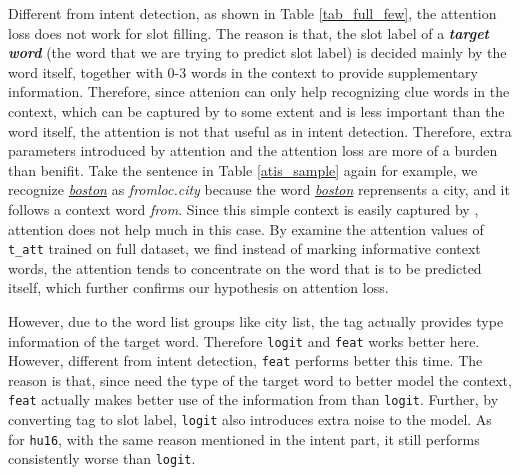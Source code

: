 Different from intent detection, as shown in Table \ref{tab_full_few}, the attention loss does not work for slot filling.
The reason is that, the slot label of a \textbf{\emph{target word}} (the word that we are trying to predict slot label) is decided mainly by the word itself, together with 0-3 words in the context to provide supplementary information.
Therefore, since attenion can only help recognizing clue words in the context, which can be captured by \BLSTM to some extent and is less important than the word itself, the attention is not that useful as in intent detection.
Therefore, extra parameters introduced by attention and the attention loss are more of a burden than benifit.
Take the sentence in Table \ref{atis_sample} again for example, we recognize \textsl{\underline{boston}} as \emph{fromloc.city} because the
word \textsl{\underline{boston}} reprensents a city, and it follows a context word \emph{from}. Since this simple context is easily
captured by \BLSTM, attention does not help much in this case. By examine the attention values of \texttt{t\_att} trained on full dataset,
we find instead of marking informative context words, the attention tends to concentrate on the word that is to be predicted itself, which
further confirms our hypothesis on attention loss.

However, due to the word list \RE groups like city list, the \RE tag actually provides type information of the target word.
Therefore \texttt{logit} and \texttt{feat} works better here.
However, different from intent detection, \texttt{feat} performs better this time.
The reason is that, since \BLSTM need the type of the target word to better model the context, \texttt{feat} actually makes better use of the information from \RE than \texttt{logit}.
Further, by converting \RE tag to slot label, \texttt{logit} also introduces extra noise to the model.
As for \texttt{hu16}, with the same reason mentioned in the intent part, it still performs consistently worse than \texttt{logit}.



